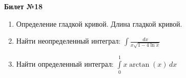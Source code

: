 \documentclass[a4paper, 12pt]{article}
\begin{document}
\begin{center}
	\textbf{Билет №18}
\end{center}
\begin{enumerate}
	\item Определение гладкой кривой. Длина гладкой кривой.
	\item Найти неопределенный интеграл: $\displaystyle \int{\frac{dx}{x \sqrt{1 - 4 \ln x}}}$
	\item Найти определенный интеграл: $\displaystyle \int\limits_{0}^{1} x \arctan(x)\,dx$
\end{enumerate}
\end{document}
